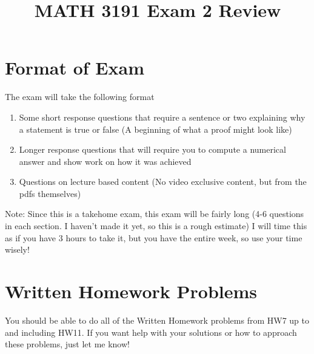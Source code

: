 \documentclass[12pt]{exam}
\title{MATH 3191 Exam 2 Review}
\date{}
\begin{document}
\maketitle
\section{Format of Exam}
The exam will take the following format
\begin{enumerate}
    \item Some short response questions that require a sentence or two explaining why a statement
        is true or false (A beginning of what a proof might look like)
    \item Longer response questions that will require you to compute a numerical answer and show work
        on how it was achieved
    \item Questions on lecture based content (No video exclusive content, but from the pdfs themselves)
\end{enumerate}
Note: Since this is a takehome exam, this exam will be fairly long (4-6 questions in each section. I haven't made it yet, so this is a rough estimate)
I will time this as if you have 3 hours to take it, but you have the entire week, so use your time wisely!
\section{Written Homework Problems}
You should be able to do all of the Written Homework problems from HW7 up to and including HW11. If you want
help with your solutions or how to approach these problems, just let me know!
\end{document}
